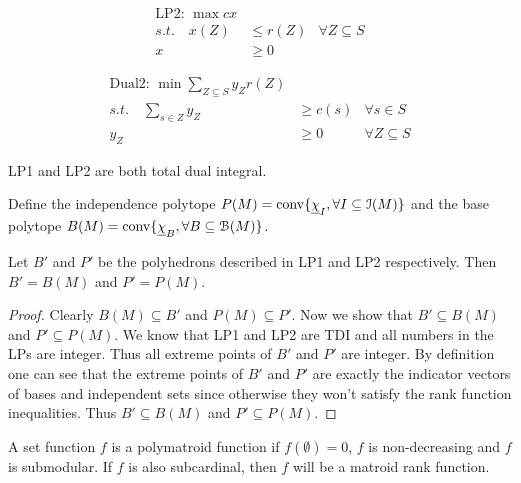 \documentclass[12pt]{article}
\begin{document}
\begin{minipage}{.45\textwidth}
\begin{align*}
    \text{LP2: } \max  cx\\
    s.t. \quad x(Z)&\leq r(Z) &\forall Z \subseteq S\\
                x&\geq 0
\end{align*}
\end{minipage}
\begin{minipage}{.45\textwidth}
    \begin{align*}
        \text{Dual2: } \min \sum_{Z\subseteq S} y_Z r(Z)\\
        s.t. \quad \sum_{s\in Z}y_Z&\geq c(s) & \forall s\in S\\
        y_Z&\geq 0 & \forall Z\subseteq S
    \end{align*}
\end{minipage}

LP1 and LP2 are both total dual integral.

Define the independence polytope $P(M)=\operatorname{conv}\{\underline{\chi}_I, \forall I\subseteq \mathcal I(M)\}$ and the base polytope $B(M)=\operatorname{conv}\{\underline{\chi}_B, \forall B\subseteq \mathcal B(M)\}$.

\begin{theorem}[5.5.8]
    Let $B'$ and $P'$ be the polyhedrons described in LP1 and LP2 respectively. Then $B'=B(M)$ and $P'=P(M)$.
\end{theorem}
\begin{proof}
    Clearly $B(M)\subseteq B'$ and $P(M)\subseteq P'$. Now we show that $B'\subseteq B(M)$ and $P'\subseteq P(M)$. We know that LP1 and LP2 are TDI and all numbers in the LPs are integer. Thus all extreme points of $B'$ and $P'$ are integer. By definition one can see that the extreme points of $B'$ and $P'$ are exactly the indicator vectors of bases and independent sets since otherwise they won't satisfy the rank function inequalities. Thus $B'\subseteq B(M)$ and $P'\subseteq P(M)$.
\end{proof}

A set function $f$ is a polymatroid function if $f(\emptyset)=0$, $f$ is non-decreasing and $f$ is submodular. If $f$ is also subcardinal, then $f$ will be a matroid rank function.
\end{document}
